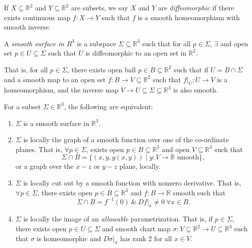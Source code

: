 \begin{definition}
    If \(X \subseteq \mathbb{R}^2\) and \(Y \subseteq \mathbb{R}^2\) are subsets, we say \(X\) and \(Y\) are \textit{diffeomorphic} if there exists continuous map \(f: X \to Y\) such that \(f\) is a smooth homeomorphism with smooth inverse.
\end{definition}
\begin{definition}
    A \textit{smooth surface in \(R^3\)} is a subspace \(\Sigma\subseteq \mathbb{R}^3\) such that for all \(p \in \Sigma\), \(\exists\) and open set \(p \in U \subseteq \Sigma\) such that \(U\) is diffeomorphic to an open set in \(\mathbb{R}^2\).

    That is, for all \(p \in \Sigma\), there exists open ball \(p \in B \subseteq \mathbb{R}^2\) such that if \(U = B \cap \Sigma\) and a smooth map to an open set \(f: B\to V \subseteq \mathbb{R}^2\) such that \(\left. f\right|_{U}:U\to V\) is a homeomorphism, and the inverse map \(V \to U \subseteq \Sigma \subseteq \mathbb{R}^3\) is also smooth.
\end{definition}
\begin{theorem}
    For a subset \(\Sigma\in \mathbb{R}^3\), the following are equivalent:
    \begin{enumerate}
        \item \(\Sigma\) is a smooth surface in \(\mathbb{R}^3\).
        \item \(\Sigma\) is locally the graph of a smooth function over one of the co-ordinate planes. That is, \(\forall p \in \Sigma\), exists open \(p \in B \subseteq \mathbb{R}^3\) and open \(V \subseteq \mathbb{R}^3\) such that
        \[
            \Sigma \cap B = \{(x,y,g(x,y))\mid g:V \to \mathbb{R} \text{ smooth}\},
        \]
        or a graph over the \(x-z\) or \(y-z\) plane, locally.
        \item \(\Sigma\) is locally cut out by a smooth function with nonzero derivative. That is, \(\forall p \in \Sigma\), there exists open \(p \in B \subseteq \mathbb{R}^3\) and \(f: B \to \mathbb{R}\) smooth such that
        \[
            \Sigma \cap B = f^{-1}(0)~\&~\left. Df\right|_x \neq 0~\forall x \in B.
        \]
        \item \(\Sigma\) is locally the image of an \textit{allowable} parametrization. That is, if \(p \in \Sigma\), there exists open \(p \in U \subseteq \Sigma\) and smooth chart map \(\sigma: V\subseteq \mathbb{R}^2 \to U\subseteq\mathbb{R}^3\) such that \(\sigma\) is homeomorphic and \(\left.D\sigma \right|_x\) has rank 2 for all \(x \in V\).
    \end{enumerate} 
\end{theorem}
